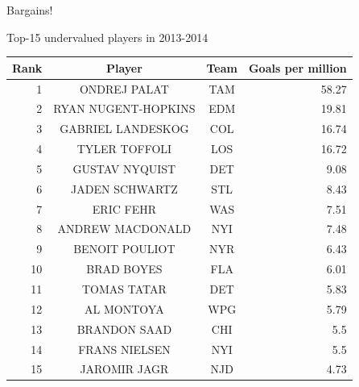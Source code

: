 \documentclass[11pt,xcolor=svgnames]{beamer}
\newcommand{\theme}{\color{DarkBlue}}
\newcommand{\gr}{\color{black!50}}
\begin{document}

\begin{frame}{Bargains!}

Top-15 undervalued players in 2013-2014
\begin{table}
	\centering\footnotesize
	\begin{tabular}{r c c r   }
		Rank & Player & Team & Goals per million  \\ 
		\hline\rule{0pt}{4ex} 
		1&ONDREJ PALAT&TAM&58.27\\
		2&RYAN NUGENT-HOPKINS&EDM&19.81\\
		3&GABRIEL LANDESKOG&COL&16.74\\
		4&TYLER TOFFOLI&LOS&16.72\\
		5&GUSTAV NYQUIST&DET&9.08\\
		6&JADEN SCHWARTZ&STL&8.43\\
		7&ERIC FEHR&WAS&7.51\\
		8&ANDREW MACDONALD&NYI&7.48\\
		9&BENOIT POULIOT&NYR&6.43\\
		10&BRAD BOYES&FLA&6.01\\
		11&TOMAS TATAR&DET&5.83\\
		12&AL MONTOYA&WPG&5.79\\
		13&BRANDON SAAD&CHI&5.5\\
		14&FRANS NIELSEN&NYI&5.5\\
		15&JAROMIR JAGR&NJD&4.73
	\end{tabular}
\end{table}

\end{frame}
\end{document}
